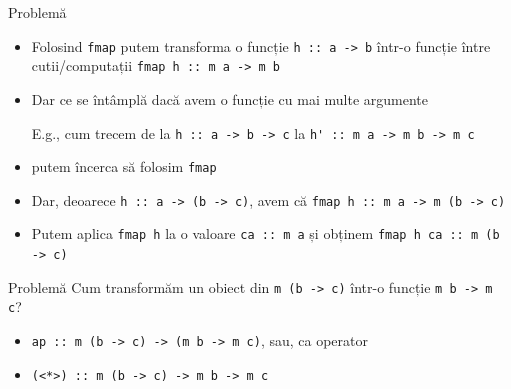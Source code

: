 \documentclass[xcolor=pdftex,romanian,colorlinks]{beamer}
\begin{document}
\begin{frame}{Problemă}
\begin{itemize}
\item Folosind \lstinline$fmap$ putem transforma o funcție \lstinline$h :: a -> b$ într-o funcție între cutii/computații \lstinline$fmap h :: m a -> m b$
\item Dar ce se întâmplă dacă avem o funcție cu mai multe argumente

E.g., cum trecem de la \lstinline$h :: a -> b -> c$   la \lstinline$h' :: m a -> m b -> m c$

\item putem încerca să folosim \lstinline$fmap$

\item Dar, deoarece \lstinline$h :: a -> (b -> c)$, avem că 
\lstinline$fmap h :: m a -> m (b -> c)$

\item Putem aplica \lstinline$fmap h$ la o valoare \lstinline$ca :: m a$ și obținem
\lstinline$fmap h ca :: m (b -> c)$
\end{itemize}
\vfill
\begin{alertblock}{Problemă}
Cum transformăm un obiect din \lstinline$m (b -> c)$ într-o funcție \lstinline$m b -> m c$?
\begin{itemize}
\item \lstinline$ap :: m (b -> c) -> (m b -> m c)$, sau, ca operator
\item \lstinline$(<*>) :: m (b -> c) -> m b -> m c$
\end{itemize}
\end{alertblock}
\end{frame}
\end{document}
